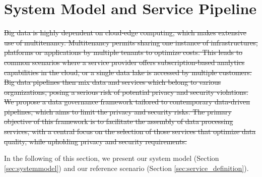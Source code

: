 \section{System Model and Service Pipeline}\label{sec:requirements}
\st{Big data is highly dependent on cloud-edge computing, which makes extensive use of multitenancy.
Multitenancy permits sharing one instance of infrastructures, platforms or applications by multiple tenants to optimize costs. This leads to common scenarios where a service provider offers subscription-based analytics capabilities in the cloud, or a single data lake is accessed by multiple customers. Big data pipelines then mix data and services which belong to various organizations, posing a serious risk of potential privacy and security violations.
We propose a data governance framework tailored to contemporary data-driven pipelines, which aims to limit the privacy and security risks. The primary objective of this framework is to facilitate the assembly of data processing services, with a central focus on the selection of those services that optimize data quality, while upholding privacy and security requirements.}

In the following of this section, we present our system model (Section \ref{sec:systemmodel}) and our reference scenario (Section \ref{sec:service_definition}).

